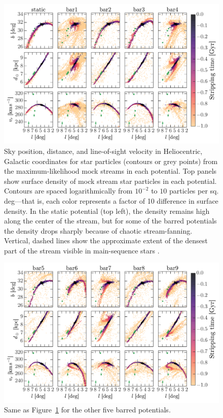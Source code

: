 \documentclass[letterpaper,12pt,preprint]{aastex}
\begin{document}
\begin{figure}[p]
\begin{center}
\includegraphics[width=\textwidth]{figures/mockstream0}
\caption{ Sky position, distance, and line-of-sight velocity in Heliocentric, Galactic coordinates for star particles (contours or grey points) from the maximum-likelihood mock streams in each potential. Top panels show surface density of mock stream star particles in each potential. Contours are spaced logarithmically from $10^{-2}$ to $10$ particles per sq. deg---that is, each color represents a factor of 10 difference in surface density. In the static potential (top left), the density remains high along the center of the stream, but for some of the barred potentials the density drops sharply because of chaotic stream-fanning. Vertical, dashed lines show the approximate extent of the densest part of the stream visible in main-sequence stars \citep[the segment originally detected in ][]{bernard14}.}
\label{fig:mockstream0}
\end{center}
\end{figure}


\begin{figure}[p]
\begin{center}
\includegraphics[width=\textwidth]{figures/mockstream1}
\caption{ Same as Figure~\ref{fig:mockstream0} for the other five barred potentials. }
\label{fig:mockstream1}
\end{center}
\end{figure}
\end{document}
